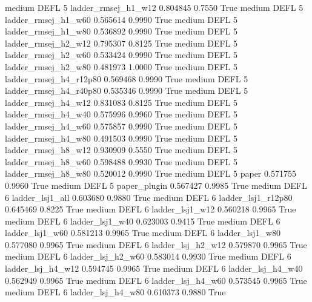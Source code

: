     medium     DEFL                 5    ladder_rmsej_h1_w12   0.804845      0.7550    True
    medium     DEFL                 5    ladder_rmsej_h1_w60   0.565614      0.9990    True
    medium     DEFL                 5    ladder_rmsej_h1_w80   0.536892      0.9990    True
    medium     DEFL                 5    ladder_rmsej_h2_w12   0.795307      0.8125    True
    medium     DEFL                 5    ladder_rmsej_h2_w60   0.533424      0.9990    True
    medium     DEFL                 5    ladder_rmsej_h2_w80   0.481973      1.0000    True
    medium     DEFL                 5 ladder_rmsej_h4_r12p80   0.569468      0.9990    True
    medium     DEFL                 5 ladder_rmsej_h4_r40p80   0.535346      0.9990    True
    medium     DEFL                 5    ladder_rmsej_h4_w12   0.831083      0.8125    True
    medium     DEFL                 5    ladder_rmsej_h4_w40   0.575996      0.9960    True
    medium     DEFL                 5    ladder_rmsej_h4_w60   0.575857      0.9990    True
    medium     DEFL                 5    ladder_rmsej_h4_w80   0.491503      0.9990    True
    medium     DEFL                 5    ladder_rmsej_h8_w12   0.930909      0.5550    True
    medium     DEFL                 5    ladder_rmsej_h8_w60   0.598488      0.9930    True
    medium     DEFL                 5    ladder_rmsej_h8_w80   0.520012      0.9990    True
    medium     DEFL                 5                  paper   0.571755      0.9960    True
    medium     DEFL                 5           paper_plugin   0.567427      0.9985    True
    medium     DEFL                 6        ladder_lsj1_all   0.603680      0.9880    True
    medium     DEFL                 6     ladder_lsj1_r12p80   0.645469      0.8225    True
    medium     DEFL                 6        ladder_lsj1_w12   0.560218      0.9965    True
    medium     DEFL                 6        ladder_lsj1_w40   0.623003      0.9415    True
    medium     DEFL                 6        ladder_lsj1_w60   0.581213      0.9965    True
    medium     DEFL                 6        ladder_lsj1_w80   0.577080      0.9965    True
    medium     DEFL                 6      ladder_lsj_h2_w12   0.579870      0.9965    True
    medium     DEFL                 6      ladder_lsj_h2_w60   0.583014      0.9930    True
    medium     DEFL                 6      ladder_lsj_h4_w12   0.594745      0.9965    True
    medium     DEFL                 6      ladder_lsj_h4_w40   0.562949      0.9965    True
    medium     DEFL                 6      ladder_lsj_h4_w60   0.573545      0.9965    True
    medium     DEFL                 6      ladder_lsj_h4_w80   0.610373      0.9880    True
